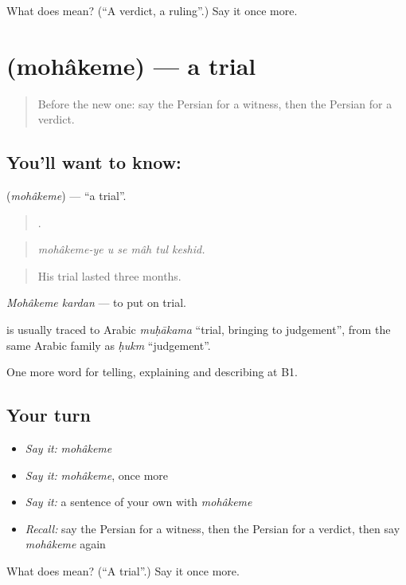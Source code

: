 \begin{tcolorbox}[breakable,colback=teal!4,colframe=teal!35!black,title={Before you move on}]
What does  mean? (\textquotedblleft{}A verdict, a ruling\textquotedblright{}.) Say it once more.
\end{tcolorbox}
\section[\texorpdfstring{\fa{محاکمه} (mohâkeme)}{محاکمه (mohâkeme)}]{ (mohâkeme) — a trial}

\label{lesson:FA-C406-mohakeme}



\begin{quote}
Before the new one: say the Persian for a witness, then the Persian for a verdict.
\end{quote}

\subsection*{You'll want to know: }
\textbf{} (\emph{mohâkeme}) — \textquotedblleft{}a trial\textquotedblright{}.

\begin{quote}
     .
\end{quote}

\begin{quote}
\emph{mohâkeme-ye u se mâh tul keshid.}
\end{quote}

\begin{quote}
His trial lasted three months.
\end{quote}

\emph{Mohâkeme kardan} — to put on trial.

\begin{cousinweb}
\textbf{} is usually traced to Arabic \emph{muḥākama} \textquotedblleft{}trial, bringing to judgement\textquotedblright{}, from the same Arabic family as \emph{ḥukm} \textquotedblleft{}judgement\textquotedblright{}.
\end{cousinweb}

\begin{grammarlens}[title={What you've built}]
One more word for telling, explaining and describing at B1.
\end{grammarlens}

\subsection*{Your turn}
\begin{itemize}
\raggedright
  \item \emph{Say it:} \emph{mohâkeme}
  \item \emph{Say it:} \emph{mohâkeme}, once more
  \item \emph{Say it:} a sentence of your own with \emph{mohâkeme}
  \item \emph{Recall:} say the Persian for a witness, then the Persian for a verdict, then say \emph{mohâkeme} again
\end{itemize}

\begin{tcolorbox}[breakable,colback=teal!4,colframe=teal!35!black,title={Before you move on}]
What does  mean? (\textquotedblleft{}A trial\textquotedblright{}.) Say it once more.
\end{tcolorbox}
